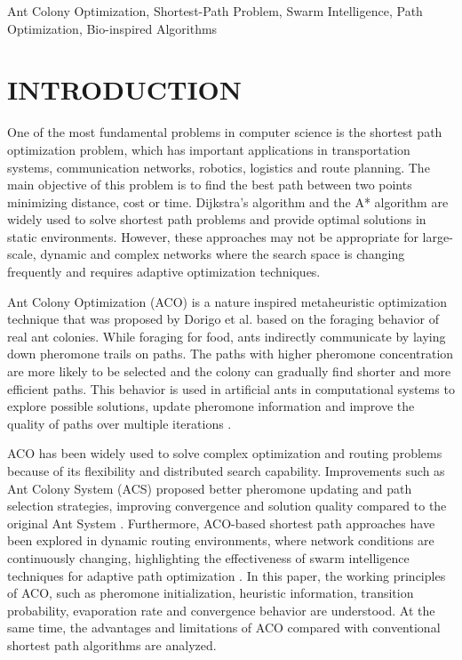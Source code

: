 \documentclass[conference]{IEEEtran}
\begin{document}
\begin{IEEEkeywords}
Ant Colony Optimization, Shortest-Path Problem, Swarm Intelligence, Path Optimization, Bio-inspired Algorithms
\end{IEEEkeywords}


\section{INTRODUCTION}

One of the most fundamental problems in computer science is the shortest path optimization problem, which has important applications in transportation systems, communication networks, robotics, logistics and route planning. The main objective of this problem is to find the best path between two points minimizing distance, cost or time. Dijkstra’s algorithm and the A* algorithm are widely used to solve shortest path problems and provide optimal solutions in static environments. However, these approaches may not be appropriate for large-scale, dynamic and complex networks where the search space is changing frequently and requires adaptive optimization techniques.

Ant Colony Optimization (ACO) is a nature inspired metaheuristic optimization technique that was proposed by Dorigo et al. based on the foraging behavior of real ant colonies. While foraging for food, ants indirectly communicate by laying down pheromone trails on paths. The paths with higher pheromone concentration are more likely to be selected and the colony can gradually find shorter and more efficient paths. This behavior is used in artificial ants in computational systems to explore possible solutions, update pheromone information and improve the quality of paths over multiple iterations \cite{dorigo1996}.

ACO has been widely used to solve complex optimization and routing problems because of its flexibility and distributed search capability. Improvements such as Ant Colony System (ACS) proposed better pheromone updating and path selection strategies, improving convergence and solution quality compared to the original Ant System \cite{dorigo1997}. Furthermore, ACO-based shortest path approaches have been explored in dynamic routing environments, where network conditions are continuously changing, highlighting the effectiveness of swarm intelligence techniques for adaptive path optimization \cite{shortestpathaco}. In this paper, the working principles of ACO, such as pheromone initialization, heuristic information, transition probability, evaporation rate and convergence behavior are understood. At the same time, the advantages and limitations of ACO compared with conventional shortest path algorithms are analyzed.
\end{document}
